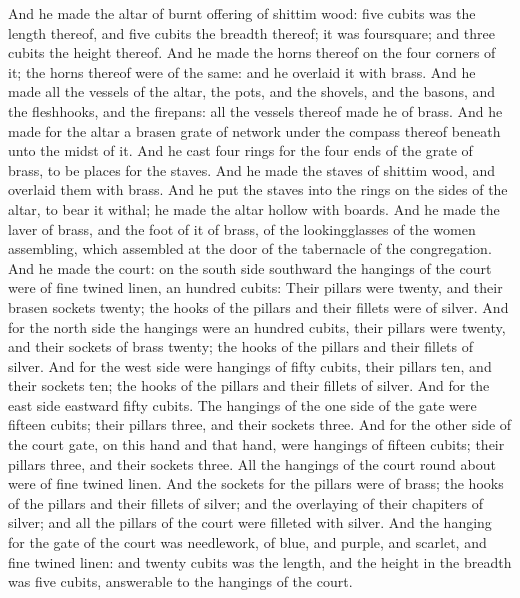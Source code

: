 \begin{biblechapter} %
 And he made the altar of burnt offering of shittim wood: five cubits was the length thereof, and five cubits the breadth thereof; it was foursquare; and three cubits the height thereof.
\verse And he made the horns thereof on the four corners of it; the horns thereof were of the same: and he overlaid it with brass.
\verse And he made all the vessels of the altar, the pots, and the shovels, and the basons, and the fleshhooks, and the firepans: all the vessels thereof made he of brass.
\verse And he made for the altar a brasen grate of network under the compass thereof beneath unto the midst of it.
\verse And he cast four rings for the four ends of the grate of brass, to be places for the staves.
\verse And he made the staves of shittim wood, and overlaid them with brass.
\verse And he put the staves into the rings on the sides of the altar, to bear it withal; he made the altar hollow with boards.
 And he made the laver of brass, and the foot of it of brass, of the lookingglasses of the women assembling, which assembled at the door of the tabernacle of the congregation.
 And he made the court: on the south side southward the hangings of the court were of fine twined linen, an hundred cubits:
\verse Their pillars were twenty, and their brasen sockets twenty; the hooks of the pillars and their fillets were of silver.
\verse And for the north side the hangings were an hundred cubits, their pillars were twenty, and their sockets of brass twenty; the hooks of the pillars and their fillets of silver.
\verse And for the west side were hangings of fifty cubits, their pillars ten, and their sockets ten; the hooks of the pillars and their fillets of silver.
\verse And for the east side eastward fifty cubits.
\verse The hangings of the one side of the gate were fifteen cubits; their pillars three, and their sockets three.
\verse And for the other side of the court gate, on this hand and that hand, were hangings of fifteen cubits; their pillars three, and their sockets three.
\verse All the hangings of the court round about were of fine twined linen.
\verse And the sockets for the pillars were of brass; the hooks of the pillars and their fillets of silver; and the overlaying of their chapiters of silver; and all the pillars of the court were filleted with silver.
\verse And the hanging for the gate of the court was needlework, of blue, and purple, and scarlet, and fine twined linen: and twenty cubits was the length, and the height in the breadth was five cubits, answerable to the hangings of the court.

\end{biblechapter}
